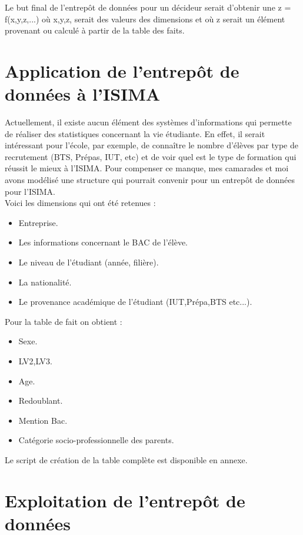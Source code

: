 \documentclass[a4paper,11pt]{report}
\begin{document}
\normalsize{
Le but final de l'entrepôt de données pour un décideur serait d'obtenir une z = f(x,y,z,...) où x,y,z, serait des valeurs des dimensions et où z serait un élément provenant ou calculé à partir de la table des faits. 
}

\section{Application de l'entrepôt de données à l'ISIMA}

\normalsize{
Actuellement, il existe aucun élément des systèmes d'informations qui permette de réaliser des statistiques concernant la vie étudiante. En effet, il serait intéressant pour l'école, par exemple, de connaître le nombre d'élèves par type de recrutement (BTS, Prépas, IUT, etc) et de voir quel est le type de formation qui réussit le mieux à l'ISIMA. Pour compenser ce manque, mes camarades et moi avons modélisé une structure qui pourrait convenir pour un entrepôt de données pour l'ISIMA.\\ Voici les dimensions qui ont été retenues :
}
\begin{itemize}
\item Entreprise.
\item Les informations concernant le BAC de l'élève.
\item Le niveau de l'étudiant (année, filière).
\item La nationalité.
\item Le provenance académique de l'étudiant (IUT,Prépa,BTS etc...).\\
\end{itemize}

\normalsize{
Pour la table de fait on obtient :
}

\begin{itemize}
\item Sexe.
\item LV2,LV3.
\item Age.
\item Redoublant.
\item Mention Bac.
\item Catégorie socio-professionnelle des parents.\\
\end{itemize}

\normalsize{
Le script de création de la table complète est disponible en annexe. 
}

\section{Exploitation de l'entrepôt de données}
\end{document}
